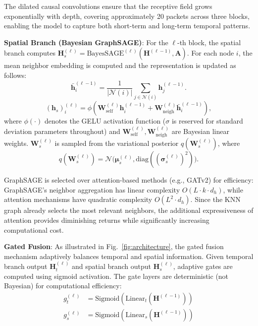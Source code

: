 \documentclass[lettersize,journal]{IEEEtran}
\begin{document}
The dilated causal convolutions ensure that the receptive field grows exponentially with depth, covering approximately 20 packets across three blocks, enabling the model to capture both short-term and long-term temporal patterns.

\textbf{Spatial Branch (Bayesian GraphSAGE)}:
For the $\ell$-th block, the spatial branch computes $\mathbf{H}_s^{(\ell)} = \text{BayesSAGE}^{(\ell)}(\mathbf{H}^{(\ell-1)}, \mathbf{A})$. For each node $i$, the mean neighbor embedding is computed and the representation is updated as follows:
\begin{equation}
\bar{\mathbf{h}}_{i}^{(\ell-1)}=\frac{1}{|\mathcal{N}(i)|}\sum_{j\in\mathcal{N}(i)}\mathbf{h}_{j}^{(\ell-1)}.
\label{eq:sage-neigh}
\end{equation}
\begin{equation}
(\mathbf{h}_s)_{i}^{(\ell)}=\phi\!\left(\mathbf{W}_{\mathrm{self}}^{(\ell)}\mathbf{h}_{i}^{(\ell-1)}
+\mathbf{W}_{\mathrm{neigh}}^{(\ell)}\bar{\mathbf{h}}_{i}^{(\ell-1)}\right),
\label{eq:sage-update}
\end{equation}
where $\phi(\cdot)$ denotes the GELU activation function ($\sigma$ is reserved for standard deviation parameters throughout) and $\mathbf{W}_{\mathrm{self}}^{(\ell)},\mathbf{W}_{\mathrm{neigh}}^{(\ell)}$
are Bayesian linear weights.
\(\mathbf{W}_s^{(\ell)}\) is sampled from the variational posterior \(q(\mathbf{W}_s^{(\ell)})\), where
\begin{equation}
q(\mathbf{W}_s^{(\ell)})=\mathcal{N}\!\big(\boldsymbol{\mu}_s^{(\ell)},\mathrm{diag}((\boldsymbol{\sigma}_s^{(\ell)})^2)\big).
\label{eq:sage-posterior}
\end{equation}


GraphSAGE is selected over attention-based methods (e.g., GATv2) for efficiency: GraphSAGE's neighbor aggregation has linear complexity $O(L \cdot k \cdot d_h)$, while attention mechanisms have quadratic complexity $O(L^2 \cdot d_h)$. Since the KNN graph already selects the most relevant neighbors, the additional expressiveness of attention provides diminishing returns while significantly increasing computational cost.

\textbf{Gated Fusion}: As illustrated in Fig.~\ref{fig:architecture}, the gated fusion mechanism adaptively balances temporal and spatial information. Given temporal branch output $\mathbf{H}_t^{(\ell)}$ and spatial branch output $\mathbf{H}_s^{(\ell)}$, adaptive gates are computed using sigmoid activation. The gate layers are deterministic (not Bayesian) for computational efficiency:
\begin{align}
g_t^{(\ell)} &= \text{Sigmoid}(\text{Linear}_t(\mathbf{H}^{(\ell-1)})) \\
g_s^{(\ell)} &= \text{Sigmoid}(\text{Linear}_s(\mathbf{H}^{(\ell-1)}))
\end{align}
\end{document}
